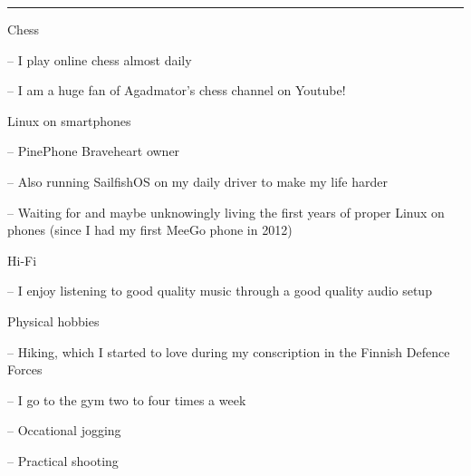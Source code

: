 \documentclass[a4paper,hidelinks,10pt]{article}
\newlength{\cvcolumngapwidth}
\newlength{\cvleftcolumnwidth}
\newlength{\cvrightcolumnwidth}
\newcommand{\cvsectionstyle}[1]{{\normalsize\cvsectionfont\textcolor{cvsectioncolor}{#1}}}
\newcommand{\cvheadingstyle}[1]{{\normalsize\cvheadingfont\textcolor{cvheadingcolor}{#1}}}
\newlength{\cvafteritemskipamount}
\newlength{\cvaftersectionskipamount}
\newlength{\cvbetweensectionandheadingextraskipamount}
\newlength{\cvparskip}
\newcommand{\cvsection}[1]{
    \begin{minipage}[t]{\cvleftcolumnwidth}
        \raggedleft\cvsectionstyle{#1}
    \end{minipage}%
    \hspace{\cvcolumngapwidth}%
    \begin{minipage}[t]{\cvrightcolumnwidth}
        \textcolor{cvrulecolor}{\rule{\cvrightcolumnwidth}{0.3mm}}
    \end{minipage}

    \vspace{\cvaftersectionskipamount}
}
\newcommand{\cvitem}[2]{
    \begin{minipage}[t]{\cvleftcolumnwidth}
        \raggedleft #1
    \end{minipage}%
    \hspace{\cvcolumngapwidth}%
    \begin{minipage}[t]{\cvrightcolumnwidth}
        \setlength{\parskip}{\cvparskip} #2
    \end{minipage}

    \vspace{\cvafteritemskipamount}
}
\begin{document}
\cvsection{PERSONAL INTERESTS}

\vspace{\cvbetweensectionandheadingextraskipamount}


\cvitem{
    \cvheadingstyle{Chess}
}{
    -- I play online chess almost daily

    -- I am a huge fan of Agadmator's chess channel on Youtube!
    
}


\cvitem{
    \cvheadingstyle{Linux on smartphones}
}{

    -- PinePhone Braveheart owner
    
    -- Also running SailfishOS on my daily driver to make my life harder
    
    -- Waiting for and maybe unknowingly living the first years of proper Linux on phones (since I had my first MeeGo phone in 2012)
    
}


\cvitem{
    \cvheadingstyle{Hi-Fi}
}{
    -- I enjoy listening to good quality music through a good quality audio setup
}


\cvitem{
    \cvheadingstyle{Physical hobbies}
}{
    -- Hiking, which I started to love during my conscription in the Finnish Defence Forces
    
    -- I go to the gym two to four times a week
    
    -- Occational jogging
    
    -- Practical shooting
}
\end{document}
